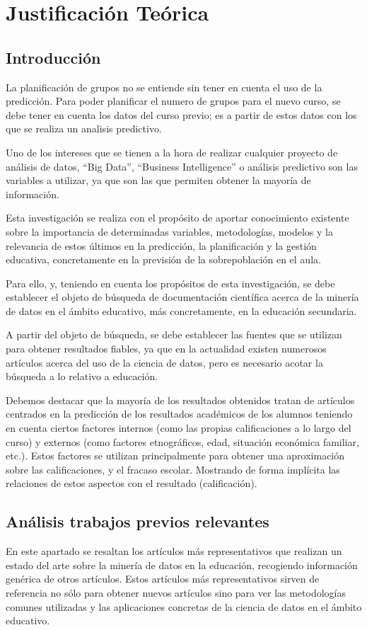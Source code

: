 \chapter{Justificación Teórica}
\section{Introducción}
La planificación de grupos no se entiende sin tener en cuenta el uso de la predicción. Para poder planificar el numero de grupos para el nuevo curso, se debe tener en cuenta los datos del curso previo; es a partir de estos datos con los que se realiza un analisis predictivo.

Uno de los intereses que se tienen a la hora de realizar cualquier proyecto de análisis de datos, ``Big Data'', ``Business Intelligence'' o análisis predictivo son las variables a utilizar, ya que son las que permiten obtener la mayoría de información.

Esta investigación se realiza con el propósito de aportar conocimiento existente sobre la importancia de determinadas variables, metodologías, modelos y la relevancia de estos últimos en la predicción, la planificación y la gestión educativa, concretamente en la previsión de la sobrepoblación en el aula. 

Para ello, y, teniendo en cuenta los propósitos de esta investigación, se debe establecer el objeto de búsqueda de documentación científica acerca de la minería de datos en el ámbito educativo, más concretamente, en la educación secundaria. 

A partir del objeto de búsqueda, se debe establecer las fuentes que se utilizan para obtener resultados fiables, ya que en la actualidad existen numerosos artículos acerca del uso de la ciencia de datos, pero es necesario acotar la búsqueda a lo relativo a educación.

Debemos destacar que la mayoría de los resultados obtenidos tratan de artículos centrados en la predicción de los resultados académicos de los alumnos teniendo en cuenta ciertos factores internos (como las propias calificaciones a lo largo del curso) y externos (como factores etnográficos, edad, situación económica familiar, etc.). Estos factores se utilizan principalmente para obtener una aproximación sobre las calificaciones, y el fracaso escolar. Mostrando de forma implícita las relaciones de estos aspectos con el resultado (calificación).

\section{Análisis trabajos previos relevantes}
En este apartado se resaltan los artículos más representativos que realizan un estado del arte sobre la minería de datos en la educación, recogiendo información genérica de otros artículos.  Estos artículos más representativos sirven de referencia no sólo para obtener nuevos artículos sino para ver las metodologías comunes utilizadas y las aplicaciones concretas de la ciencia de datos en el ámbito educativo.

